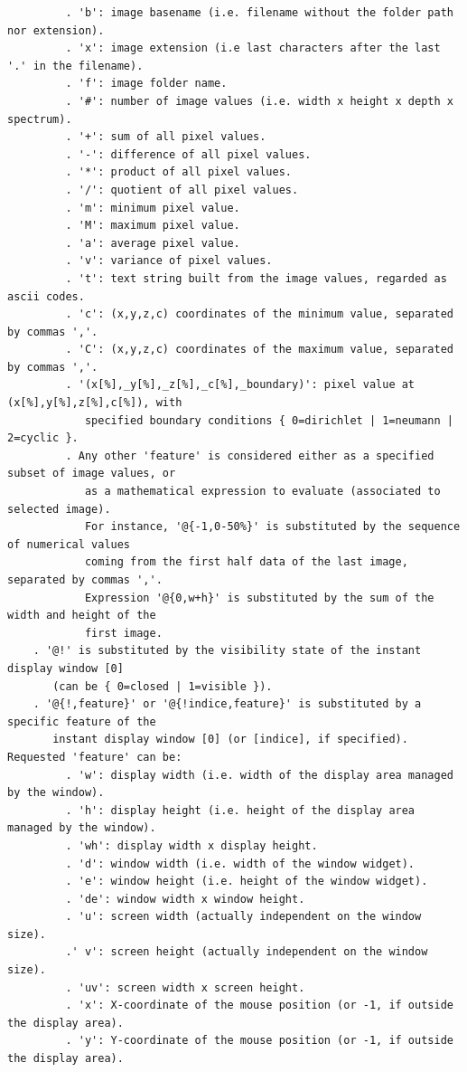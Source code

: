 \documentclass[a4paper,11pt,twoside]{book}
\begin{document}
\begin{lstlisting}
         . 'b': image basename (i.e. filename without the folder path nor extension). 
         . 'x': image extension (i.e last characters after the last '.' in the filename). 
         . 'f': image folder name. 
         . '#': number of image values (i.e. width x height x depth x spectrum). 
         . '+': sum of all pixel values. 
         . '-': difference of all pixel values. 
         . '*': product of all pixel values. 
         . '/': quotient of all pixel values. 
         . 'm': minimum pixel value. 
         . 'M': maximum pixel value. 
         . 'a': average pixel value. 
         . 'v': variance of pixel values. 
         . 't': text string built from the image values, regarded as ascii codes. 
         . 'c': (x,y,z,c) coordinates of the minimum value, separated by commas ','. 
         . 'C': (x,y,z,c) coordinates of the maximum value, separated by commas ','. 
         . '(x[%],_y[%],_z[%],_c[%],_boundary)': pixel value at (x[%],y[%],z[%],c[%]), with 
            specified boundary conditions { 0=dirichlet | 1=neumann | 2=cyclic }. 
         . Any other 'feature' is considered either as a specified subset of image values, or 
            as a mathematical expression to evaluate (associated to selected image). 
            For instance, '@{-1,0-50%}' is substituted by the sequence of numerical values 
            coming from the first half data of the last image, separated by commas ','. 
            Expression '@{0,w+h}' is substituted by the sum of the width and height of the 
            first image. 
    . '@!' is substituted by the visibility state of the instant display window [0] 
       (can be { 0=closed | 1=visible }). 
    . '@{!,feature}' or '@{!indice,feature}' is substituted by a specific feature of the 
       instant display window [0] (or [indice], if specified). Requested 'feature' can be: 
         . 'w': display width (i.e. width of the display area managed by the window). 
         . 'h': display height (i.e. height of the display area managed by the window). 
         . 'wh': display width x display height. 
         . 'd': window width (i.e. width of the window widget). 
         . 'e': window height (i.e. height of the window widget). 
         . 'de': window width x window height. 
         . 'u': screen width (actually independent on the window size). 
         .' v': screen height (actually independent on the window size). 
         . 'uv': screen width x screen height. 
         . 'x': X-coordinate of the mouse position (or -1, if outside the display area). 
         . 'y': Y-coordinate of the mouse position (or -1, if outside the display area). 

\end{lstlisting}
\end{document}
